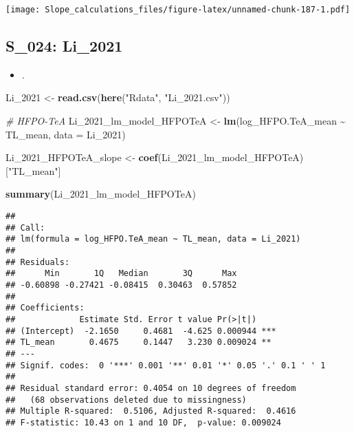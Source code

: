 \documentclass[
]{article}
\newenvironment{Shaded}{\begin{snugshade}}{\end{snugshade}}
\newcommand{\AttributeTok}[1]{\textcolor[rgb]{0.13,0.29,0.53}{#1}}
\newcommand{\CommentTok}[1]{\textcolor[rgb]{0.56,0.35,0.01}{\textit{#1}}}
\newcommand{\FunctionTok}[1]{\textcolor[rgb]{0.13,0.29,0.53}{\textbf{#1}}}
\newcommand{\NormalTok}[1]{#1}
\newcommand{\OtherTok}[1]{\textcolor[rgb]{0.56,0.35,0.01}{#1}}
\newcommand{\SpecialCharTok}[1]{\textcolor[rgb]{0.81,0.36,0.00}{\textbf{#1}}}
\newcommand{\StringTok}[1]{\textcolor[rgb]{0.31,0.60,0.02}{#1}}
\providecommand{\tightlist}{%
  \setlength{\itemsep}{0pt}\setlength{\parskip}{0pt}}
\begin{document}
\texttt{[image: Slope\_calculations\_files/figure-latex/unnamed-chunk-187-1.pdf]}

\subsection{S\_024: Li\_2021}\label{s_024-li_2021-1}

\begin{itemize}
\tightlist
\item
  .
\end{itemize}

\begin{Shaded}
\begin{Highlighting}[]
\NormalTok{Li\_2021 }\OtherTok{\textless{}{-}} \FunctionTok{read.csv}\NormalTok{(}\FunctionTok{here}\NormalTok{(}\StringTok{"Rdata"}\NormalTok{, }\StringTok{"Li\_2021.csv"}\NormalTok{))}

\CommentTok{\# HFPO{-}TeA}
\NormalTok{Li\_2021\_lm\_model\_HFPOTeA }\OtherTok{\textless{}{-}} \FunctionTok{lm}\NormalTok{(log\_HFPO.TeA\_mean }\SpecialCharTok{\textasciitilde{}}\NormalTok{ TL\_mean,}
                                    \AttributeTok{data =}\NormalTok{ Li\_2021)}

\NormalTok{Li\_2021\_HFPOTeA\_slope }\OtherTok{\textless{}{-}} \FunctionTok{coef}\NormalTok{(Li\_2021\_lm\_model\_HFPOTeA)[}\StringTok{"TL\_mean"}\NormalTok{]}

\FunctionTok{summary}\NormalTok{(Li\_2021\_lm\_model\_HFPOTeA)}
\end{Highlighting}
\end{Shaded}

\begin{verbatim}
## 
## Call:
## lm(formula = log_HFPO.TeA_mean ~ TL_mean, data = Li_2021)
## 
## Residuals:
##      Min       1Q   Median       3Q      Max 
## -0.60898 -0.27421 -0.08415  0.30463  0.57852 
## 
## Coefficients:
##             Estimate Std. Error t value Pr(>|t|)    
## (Intercept)  -2.1650     0.4681  -4.625 0.000944 ***
## TL_mean       0.4675     0.1447   3.230 0.009024 ** 
## ---
## Signif. codes:  0 '***' 0.001 '**' 0.01 '*' 0.05 '.' 0.1 ' ' 1
## 
## Residual standard error: 0.4054 on 10 degrees of freedom
##   (68 observations deleted due to missingness)
## Multiple R-squared:  0.5106, Adjusted R-squared:  0.4616 
## F-statistic: 10.43 on 1 and 10 DF,  p-value: 0.009024
\end{verbatim}
\end{document}
